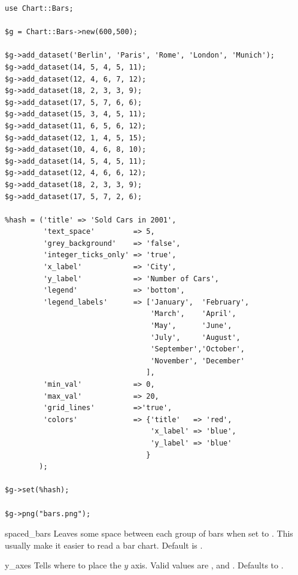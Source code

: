 {\small
\begin{verbatim}
use Chart::Bars;

$g = Chart::Bars->new(600,500);

$g->add_dataset('Berlin', 'Paris', 'Rome', 'London', 'Munich');
$g->add_dataset(14, 5, 4, 5, 11);
$g->add_dataset(12, 4, 6, 7, 12);
$g->add_dataset(18, 2, 3, 3, 9);
$g->add_dataset(17, 5, 7, 6, 6);
$g->add_dataset(15, 3, 4, 5, 11);
$g->add_dataset(11, 6, 5, 6, 12);
$g->add_dataset(12, 1, 4, 5, 15);
$g->add_dataset(10, 4, 6, 8, 10);
$g->add_dataset(14, 5, 4, 5, 11);
$g->add_dataset(12, 4, 6, 6, 12);
$g->add_dataset(18, 2, 3, 3, 9);
$g->add_dataset(17, 5, 7, 2, 6);

%hash = ('title' => 'Sold Cars in 2001',
         'text_space'         => 5,
         'grey_background'    => 'false',
         'integer_ticks_only' => 'true',
         'x_label'            => 'City',
         'y_label'            => 'Number of Cars',
         'legend'             => 'bottom',
         'legend_labels'      => ['January',  'February', 
                                  'March',    'April',
                                  'May',      'June', 
                                  'July',     'August',
                                  'September','October', 
                                  'November', 'December'
                                 ],
         'min_val'            => 0,
         'max_val'            => 20,
         'grid_lines'         =>'true',
         'colors'             => {'title'   => 'red',
                                  'x_label' => 'blue',
                                  'y_label' => 'blue'
                                 }
        );

$g->set(%hash);

$g->png("bars.png");
\end{verbatim}
}

\constructorblurb{\thisname}

\begin{AttrDecl}{spaced\_bars}
Leaves some space between each group of bars when set to .
This usually make it easier to read a bar chart. Default is
.
\end{AttrDecl}

\begin{AttrDecl}{y\_axes}
Tells \thisclass where to place the $y$ axis. Valid values are
,  and . Defaults to
.
\end{AttrDecl}
